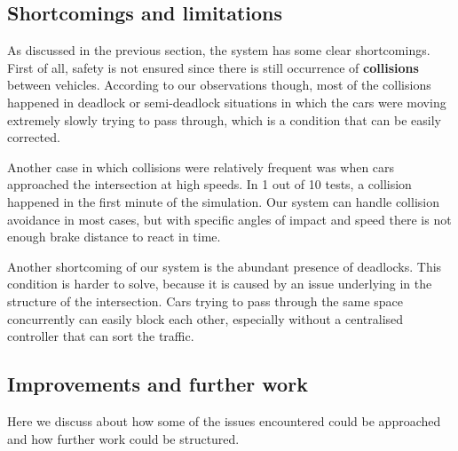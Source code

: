 \iffalse
\begin{itemize}
\item Discuss experimental results. ~
\item Shortcomings of model.
\item Improvements for further tests.
\item traffic fairness - distribution
\end{itemize}
\fi

\subsection{Shortcomings and limitations}
 
As discussed in the previous section, the system has some clear shortcomings.
First of all, safety is not ensured since there is still occurrence of \textbf{collisions} between vehicles.
According to our observations though, most of the collisions happened in deadlock or semi-deadlock situations in which the cars were moving extremely slowly trying to pass through, which is a condition that can be easily corrected.

Another case in which collisions were relatively frequent was when cars approached the intersection at high speeds.
In 1 out of 10 tests, a collision happened in the first minute of the simulation.
Our system can handle collision avoidance in most cases, but with specific angles of impact and speed there is not enough brake distance to react in time.
\newline

Another shortcoming of our system is the abundant presence of deadlocks.
This condition is harder to solve, because it is caused by an issue underlying in the structure of the intersection.
Cars trying to pass through the same space concurrently can easily block each other, especially without a centralised controller that can sort the traffic.

\subsection{Improvements and further work}

Here we discuss about how some of the issues encountered could be approached and how further work could be structured.

